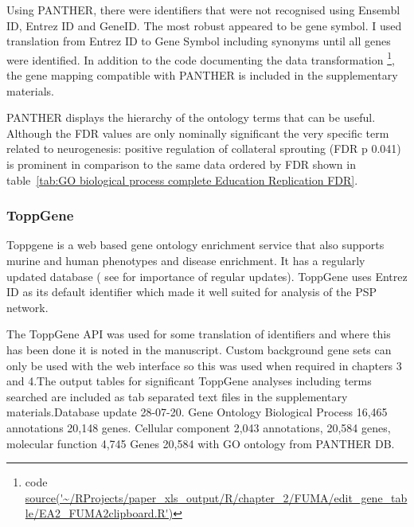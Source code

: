 




Using PANTHER, there were identifiers that were not recognised using Ensembl ID, Entrez ID and GeneID. The most robust appeared to be gene symbol. I used translation from Entrez ID to Gene Symbol including synonyms until all genes were identified. In addition to the code documenting the data transformation \footnote{code \url{ source('~/RProjects/paper_xls_output/R/chapter_2/FUMA/edit_gene_table/EA2_FUMA2clipboard.R')}}, the gene mapping compatible with PANTHER is included in the supplementary materials.

PANTHER displays the hierarchy of the ontology terms that can be useful. Although the FDR values are only nominally significant the very specific term related to neurogenesis: positive regulation of collateral sprouting (FDR p 0.041) is prominent in comparison to the same data ordered by FDR shown in table~\ref{tab:GO biological process complete Education Replication FDR}.

\subsubsection{ToppGene}
\label{sec:ToppGene GO enrichment}
 Toppgene is a web based gene ontology enrichment service that also supports murine and human phenotypes and disease enrichment\cite{chen2009toppgene}. It has a regularly updated database ( see \cite{tomczak2018interpretation} for importance of regular updates). ToppGene uses Entrez ID as its default identifier which made it well suited for analysis of the PSP network.
 
 The ToppGene API was used for some translation of identifiers and where this has been done it is noted in the manuscript. Custom background gene sets can only be used with the web interface so this was used when required in chapters 3 and 4.The output tables for significant ToppGene analyses including terms searched are included as tab separated text files  in the supplementary materials.Database update 28-07-20. Gene Ontology Biological Process 16,465 annotations 20,148 genes. Cellular component  2,043 annotations, 20,584 genes, molecular function 4,745 Genes 20,584 with GO ontology from PANTHER DB.  
 

